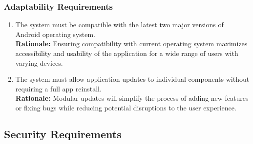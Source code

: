 \documentclass{article}
\begin{document}
\subsubsection{Adaptability Requirements}
\label{ssub:adaptability_requirements}
\begin{enumerate}[{MS-A}1. ]
	\item The system must be compatible with the latest two major versions of Android operating system. \\
	\textbf{Rationale:} Ensuring compatibility with current operating system maximizes accessibility and usability of the application for a wide range of users with varying devices.
	\item The system must allow application updates to individual components without requiring a full app reinstall. \\
	\textbf{Rationale:} Modular updates will simplify the process of adding new features or fixing bugs while reducing potential disruptions to the user experience.
\end{enumerate}


\subsection{Security Requirements}
\label{sub:security_requirements}
\end{document}
